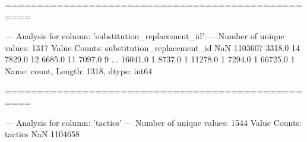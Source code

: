 ==================================================

--- Analysis for column: 'substitution_replacement_id' ---
Number of unique values: 1317
Value Counts:
substitution_replacement_id
NaN        1103607
3318.0          14
7829.0          12
6685.0          11
7097.0           9
            ...   
16041.0          1
8737.0           1
11278.0          1
7294.0           1
66725.0          1
Name: count, Length: 1318, dtype: int64

==================================================

--- Analysis for column: 'tactics' ---
Number of unique values: 1544
Value Counts:
tactics
NaN                                                                                                                                                                                                                                                                                                                                                                                                                                                                                                                                                                                                                                                                                                                                                                                                                                                                                                                                                                                                                                                                                                                                                                                                                                                                                                                                                                                                                                                                                                                1104658

